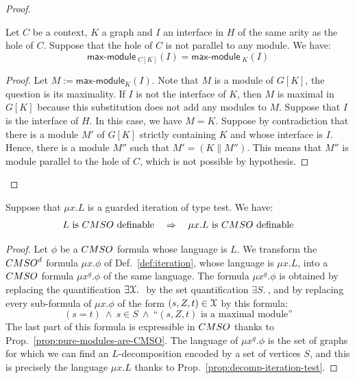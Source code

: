 \begin{proof}
\begin{lemma}\label{lem-max-modules-context} Let $C$ be a context, $K$ a graph  and $I$ an interface in $H$ of the same arity as the hole of $C$. Suppose that the hole of $C$ is not parallel to any module. We have:
$$ \mathsf{max\text{-}module}_{\;C[K]}(I)=\mathsf{max\text{-}module}_{\;K}(I)$$
\end{lemma}
\begin{proof} Let $M:=\mathsf{max\text{-}module}_K(I)$.
Note that $M$ is a module of $G[K]$,  the question is its maximality. 
If $I$ is not the interface of $K$, then $M$ is maximal in  $G[K]$ because this substitution does not add any modules to $M$. 
Suppose that $I$ is the interface of $H$. In this case, we have $M=K$. Suppose by contradiction that there is a module $M'$ of  $G[K]$ strictly  containing  $K$ and whose interface is $I$. Hence, there is a module $M''$ such that $M'=(K\parallel M'')$. This means that $M''$ is module parallel to the hole of  $C$, which is not possible by hypothesis. 
\end{proof}
\end{proof}


\begin{theorem} 
Suppose that $\mu x. L$ is a guarded iteration of type test. We have: 
$$ L\text{ is $\CMSO$ definable} \quad \Rightarrow \quad  \mu x.L \text{ is  $\CMSO$ definable}$$
\end{theorem}

\begin{proof} Let $\phi$ be a $\CMSO$ formula whose language is $L$.
We transform the $\CMSOd$ formula $\mu x. \phi$ of Def.~\ref{def:iteration}, whose language is $\mu x. L$, into a $\CMSO$ formula  ${\mu x^g. \phi}$ of the same language. The formula ${\mu x^g. \phi}$ is obtained by replacing the quantification $\exists \mathcal X.\ $ by the set quantification $\exists S.\ $, and by replacing every sub-formula of $\mu x. \phi$ of the form $(s,Z,t)\in \mathcal X$ by this formula: 
$$(s=t) \ \wedge\ s\in S \ \wedge\ \text{``$(s,Z,t)$ is a maximal module''} $$
The last part of this formula is expressible in $\CMSO$ thanks to Prop.~\ref{prop:pure-modules-are-CMSO}. The language of ${\mu x^g. \phi}$ is the set of graphs for which we can find an $L$-decomposition encoded by a set of vertices $S$, and this is precisely the language $\mu x. L$ thanks to Prop.~\ref{prop:decomp-iteration-test}.
\end{proof}

